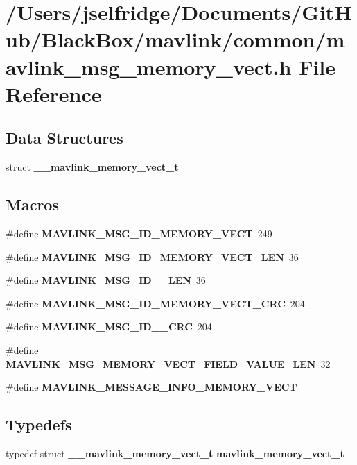 \section{/\+Users/jselfridge/\+Documents/\+Git\+Hub/\+Black\+Box/mavlink/common/mavlink\+\_\+msg\+\_\+memory\+\_\+vect.h File Reference}
\label{mavlink__msg__memory__vect_8h}
\subsection*{Data Structures}
\begin{DoxyCompactItemize}
\item 
struct \textbf{ \+\_\+\+\_\+mavlink\+\_\+memory\+\_\+vect\+\_\+t}
\end{DoxyCompactItemize}
\subsection*{Macros}
\begin{DoxyCompactItemize}
\item 
\#define \textbf{ M\+A\+V\+L\+I\+N\+K\+\_\+\+M\+S\+G\+\_\+\+I\+D\+\_\+\+M\+E\+M\+O\+R\+Y\+\_\+\+V\+E\+CT}~249
\item 
\#define \textbf{ M\+A\+V\+L\+I\+N\+K\+\_\+\+M\+S\+G\+\_\+\+I\+D\+\_\+\+M\+E\+M\+O\+R\+Y\+\_\+\+V\+E\+C\+T\+\_\+\+L\+EN}~36
\item 
\#define \textbf{ M\+A\+V\+L\+I\+N\+K\+\_\+\+M\+S\+G\+\_\+\+I\+D\+\_\+\_\+\+L\+EN}~36
\item 
\#define \textbf{ M\+A\+V\+L\+I\+N\+K\+\_\+\+M\+S\+G\+\_\+\+I\+D\+\_\+\+M\+E\+M\+O\+R\+Y\+\_\+\+V\+E\+C\+T\+\_\+\+C\+RC}~204
\item 
\#define \textbf{ M\+A\+V\+L\+I\+N\+K\+\_\+\+M\+S\+G\+\_\+\+I\+D\+\_\+\_\+\+C\+RC}~204
\item 
\#define \textbf{ M\+A\+V\+L\+I\+N\+K\+\_\+\+M\+S\+G\+\_\+\+M\+E\+M\+O\+R\+Y\+\_\+\+V\+E\+C\+T\+\_\+\+F\+I\+E\+L\+D\+\_\+\+V\+A\+L\+U\+E\+\_\+\+L\+EN}~32
\item 
\#define \textbf{ M\+A\+V\+L\+I\+N\+K\+\_\+\+M\+E\+S\+S\+A\+G\+E\+\_\+\+I\+N\+F\+O\+\_\+\+M\+E\+M\+O\+R\+Y\+\_\+\+V\+E\+CT}
\end{DoxyCompactItemize}
\subsection*{Typedefs}
\begin{DoxyCompactItemize}
\item 
typedef struct \textbf{ \+\_\+\+\_\+mavlink\+\_\+memory\+\_\+vect\+\_\+t} \textbf{ mavlink\+\_\+memory\+\_\+vect\+\_\+t}
\end{DoxyCompactItemize}


